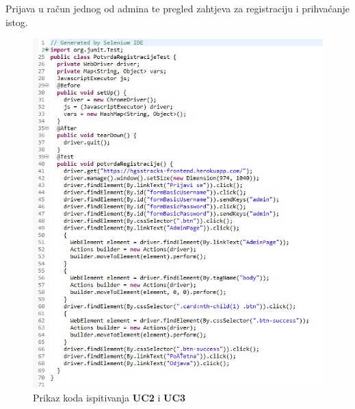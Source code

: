 			\newpage
			\begin{packed_item}
				\item {Prijava u račun jednog od admina te pregled zahtjeva za registraciju i prihvaćanje istog.}\\
				
				\begin{figure}[h!]
					\centering
					\includegraphics[width=\linewidth]{./slike/ManipulacijaRegistracija.jpg}
					\caption{Prikaz koda ispitivanja \textbf{UC2} i \textbf{UC3}}
				\end{figure}
				\eject
			\end{packed_item}
		
